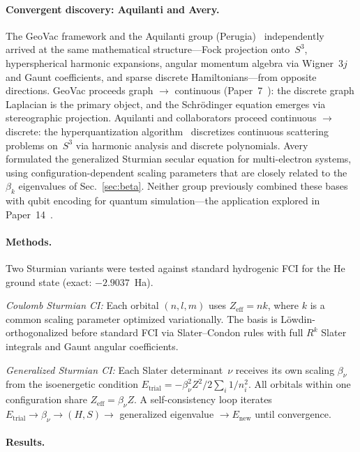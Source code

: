 \documentclass[aps,pra,twocolumn,superscriptaddress,longbibliography]{revtex4-2}
\begin{document}
\paragraph{Convergent discovery: Aquilanti and Avery.}
The GeoVac framework and the Aquilanti group
(Perugia)~\cite{Aquilanti1986,Aquilanti1990,Aquilanti2001} independently
arrived at the same mathematical structure---Fock projection onto~$S^3$,
hyperspherical harmonic expansions, angular momentum algebra via
Wigner~$3j$ and Gaunt coefficients, and sparse discrete
Hamiltonians---from opposite directions.  GeoVac proceeds graph $\to$
continuous (Paper~7~\cite{loutey_paper7}): the discrete graph Laplacian
is the primary object, and the Schr\"odinger equation emerges via
stereographic projection.  Aquilanti and collaborators proceed continuous
$\to$ discrete: the hyperquantization
algorithm~\cite{DeFazio2003,AquilantiCapecchi2000} discretizes continuous
scattering problems on~$S^3$ via harmonic analysis and discrete
polynomials.  Avery~\cite{Avery2004} formulated the generalized Sturmian
secular equation for multi-electron systems, using
configuration-dependent scaling parameters that are closely related to
the $\beta_k$ eigenvalues of Sec.~\ref{sec:beta}.  Neither group
previously combined these bases with qubit encoding for quantum
simulation---the application explored in
Paper~14~\cite{loutey_paper14}.

\paragraph{Methods.}
Two Sturmian variants were tested against standard hydrogenic FCI for
the He ground state (exact: $-2.9037$~Ha).

\emph{Coulomb Sturmian CI:} Each orbital $(n,l,m)$ uses
$Z_{\mathrm{eff}} = n k$, where $k$ is a common scaling parameter
optimized variationally.  The basis is L\"owdin-orthogonalized before
standard FCI via Slater--Condon rules with full $R^k$ Slater integrals
and Gaunt angular coefficients.

\emph{Generalized Sturmian CI:} Each Slater determinant~$\nu$ receives
its own scaling $\beta_\nu$ from the isoenergetic condition
$E_{\mathrm{trial}} = -\beta_\nu^2 Z^2 / 2 \sum_i 1/n_i^2$.
All orbitals within one configuration share
$Z_{\mathrm{eff}} = \beta_\nu Z$.  A self-consistency loop iterates
$E_{\mathrm{trial}} \to \beta_\nu \to (H, S) \to$ generalized
eigenvalue $\to E_{\mathrm{new}}$ until convergence.

\paragraph{Results.}
\end{document}

